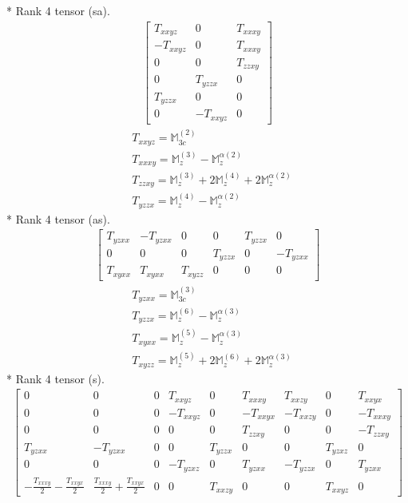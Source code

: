 \documentclass[fleqn,8pt,landscape]{jsarticle}
\begin{document}
* Rank 4 tensor (sa).
\begin{align*}
\begin{bmatrix} T_{xxyz} & 0 & T_{xxxy} \\ - T_{xxyz} & 0 & T_{xxxy} \\ 0 & 0 & T_{zzxy} \\ 0 & T_{yzzx} & 0 \\ T_{yzzx} & 0 & 0 \\ 0 & - T_{xxyz} & 0 \end{bmatrix}
\end{align*}
\begin{align*}
& T_{xxyz} = \mathbb{M}_{3c}^{(2)} \\
& T_{xxxy} = \mathbb{M}_{z}^{(3)} - \mathbb{M}_{z}^{\alpha(2)} \\
& T_{zzxy} = \mathbb{M}_{z}^{(3)} + 2 \mathbb{M}_{z}^{(4)} + 2 \mathbb{M}_{z}^{\alpha(2)} \\
& T_{yzzx} = \mathbb{M}_{z}^{(4)} - \mathbb{M}_{z}^{\alpha(2)}
\end{align*}
* Rank 4 tensor (as).
\begin{align*}
\begin{bmatrix} T_{yzxx} & - T_{yzxx} & 0 & 0 & T_{yzzx} & 0 \\ 0 & 0 & 0 & T_{yzzx} & 0 & - T_{yzxx} \\ T_{xyxx} & T_{xyxx} & T_{xyzz} & 0 & 0 & 0 \end{bmatrix}
\end{align*}
\begin{align*}
& T_{yzxx} = \mathbb{M}_{3c}^{(3)} \\
& T_{yzzx} = \mathbb{M}_{z}^{(6)} - \mathbb{M}_{z}^{\alpha(3)} \\
& T_{xyxx} = \mathbb{M}_{z}^{(5)} - \mathbb{M}_{z}^{\alpha(3)} \\
& T_{xyzz} = \mathbb{M}_{z}^{(5)} + 2 \mathbb{M}_{z}^{(6)} + 2 \mathbb{M}_{z}^{\alpha(3)}
\end{align*}
* Rank 4 tensor (s).
\begin{align*}
\begin{bmatrix} 0 & 0 & 0 & T_{xxyz} & 0 & T_{xxxy} & T_{xxzy} & 0 & T_{xxyx} \\ 0 & 0 & 0 & - T_{xxyz} & 0 & - T_{xxyx} & - T_{xxzy} & 0 & - T_{xxxy} \\ 0 & 0 & 0 & 0 & 0 & T_{zzxy} & 0 & 0 & - T_{zzxy} \\ T_{yzxx} & - T_{yzxx} & 0 & 0 & T_{yzzx} & 0 & 0 & T_{yzxz} & 0 \\ 0 & 0 & 0 & - T_{yzxz} & 0 & T_{yzxx} & - T_{yzzx} & 0 & T_{yzxx} \\ - \frac{T_{xxxy}}{2} - \frac{T_{xxyx}}{2} & \frac{T_{xxxy}}{2} + \frac{T_{xxyx}}{2} & 0 & 0 & T_{xxzy} & 0 & 0 & T_{xxyz} & 0 \end{bmatrix}
\end{align*}
\end{document}
